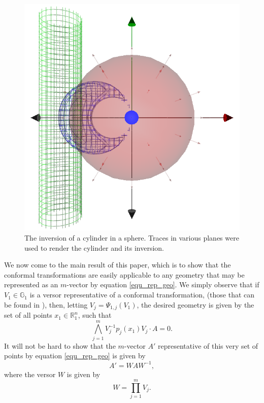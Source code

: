 \documentclass{ecgd-l}
\theoremstyle{definition}
\theoremstyle{remark}
\numberwithin{equation}{section}
\newcommand{\G}{\mathbb{G}}
\newcommand{\R}{\mathbb{R}}
\begin{document}
\begin{figure}
\includegraphics[scale=0.3]{InvertCylinderInSphere}
\caption{The inversion of a cylinder in a sphere.  Traces in various planes were
used to render the cylinder and its inversion.}
\label{fig_invert_cylinder_in_sphere}
\end{figure}
We now come to the main result of this paper, which is to show
that the conformal transformations are easily applicable to any geometry
that may be represented as an $m$-vector by equation \eqref{equ_rep_geo}.
We simply observe that if $V_1\in\G_1$ is a versor representative
of a conformal transformation, (those that can be found in \cite{Dorst07,LiRockwood01}),
then, letting $V_j=\Psi_{1,j}(V_1)$, the desired
geometry is given by the set of all points $x_1\in\R^n_1$, such that
\begin{equation*}
\bigwedge_{j=1}^m V_j^{-1} p_j(x_1) V_j\cdot A=0.
\end{equation*}
It will not be hard to show that the $m$-vector $A'$ representative
of this very set of points by equation \eqref{equ_rep_geo} is given by
\begin{equation*}
A' = WAW^{-1},
\end{equation*}
where the versor $W$ is given by
\begin{equation*}
W = \prod_{j=1}^m V_j.
\end{equation*}
\end{document}
